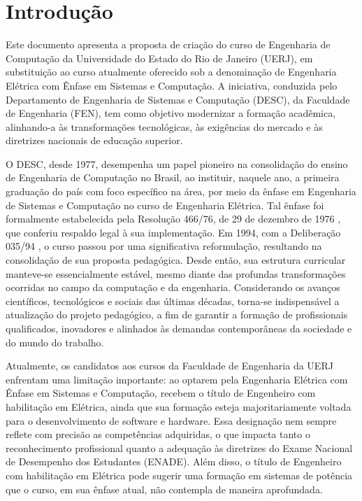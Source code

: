 \chapter{Introdução}
\thispagestyle{plain}
\label{intro} %

Este documento apresenta a proposta de criação do curso de Engenharia de Computação da Universidade do Estado do Rio de Janeiro (UERJ), em substituição ao curso atualmente oferecido sob a denominação de Engenharia Elétrica com Ênfase em Sistemas e Computação. A iniciativa, conduzida pelo Departamento de Engenharia de Sistemas e Computação (DESC), da Faculdade de Engenharia (FEN), tem como objetivo modernizar a formação acadêmica, alinhando-a às transformações tecnológicas, às exigências do mercado e às diretrizes nacionais de educação superior.

O DESC, desde 1977, desempenha um papel pioneiro na consolidação do ensino de Engenharia de Computação no Brasil, ao instituir, naquele ano, a primeira graduação do país com foco específico na área, por meio da ênfase em Engenharia de Sistemas e Computação no curso de Engenharia Elétrica. Tal ênfase foi formalmente estabelecida pela Resolução  466/76, de 29 de dezembro de 1976 \cite{uerj1976}, que conferiu respaldo legal à sua implementação. Em 1994, com a Deliberação  035/94 \cite{uerj1994}, o curso passou por uma significativa reformulação, resultando na consolidação de sua proposta pedagógica. Desde então, sua estrutura curricular manteve-se essencialmente estável, mesmo diante das profundas transformações ocorridas no campo da computação e da engenharia. Considerando os avanços científicos, tecnológicos e sociais das últimas décadas, torna-se indispensável a atualização do projeto pedagógico, a fim de garantir a formação de profissionais qualificados, inovadores e alinhados às demandas contemporâneas da sociedade e do mundo do trabalho.

Atualmente, os candidatos aos cursos da Faculdade de Engenharia da UERJ enfrentam uma limitação importante: ao optarem pela Engenharia Elétrica com Ênfase em Sistemas e Computação, recebem o título de Engenheiro com habilitação em Elétrica, ainda que sua formação esteja majoritariamente voltada para o desenvolvimento de software e hardware. Essa designação nem sempre reflete com precisão as competências adquiridas, o que impacta tanto o reconhecimento profissional quanto a adequação às diretrizes do Exame Nacional de Desempenho dos Estudantes (ENADE). Além disso, o título de Engenheiro com habilitação em Elétrica pode sugerir uma formação em sistemas de potência que o curso, em sua ênfase atual, não contempla de maneira aprofundada.

